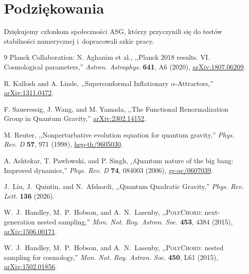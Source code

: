\documentclass[11pt,a4paper]{article}
\begin{document}
\section*{Podziękowania}
Dziękujemy członkom społeczności ASG, którzy przyczynili się do testów stabilności numerycznej i~dopracowali szkic pracy.

\begin{thebibliography}{9}
Planck Collaboration: N. Aghanim et al., ,,Planck 2018 results. VI. Cosmological parameters,'' \textit{Astron. Astrophys.} \textbf{641}, A6 (2020), \href{https://arxiv.org/abs/1807.06209}{arXiv:1807.06209}.

R. Kallosh and A. Linde, ,,Superconformal Inflationary $\alpha$-Attractors,'' \href{https://arxiv.org/abs/1311.0472}{arXiv:1311.0472}.

F. Saueressig, J. Wang, and M. Yamada, ,,The Functional Renormalization Group in Quantum Gravity,'' \href{https://arxiv.org/abs/2302.14152}{arXiv:2302.14152}.

M. Reuter, ,,Nonperturbative evolution equation for quantum gravity,'' \textit{Phys. Rev. D} \textbf{57}, 971 (1998), \href{https://arxiv.org/abs/hep-th/9605030}{hep-th/9605030}.

A. Ashtekar, T. Pawlowski, and P. Singh, ,,Quantum nature of the big bang: Improved dynamics,'' \textit{Phys. Rev. D} \textbf{74}, 084003 (2006), \href{https://arxiv.org/abs/gr-qc/0607039}{gr-qc/0607039}.

J.~Liu, J.~Quintin, and N.~Afshordi, ,,Quantum Quadratic Gravity,'' \textit{Phys. Rev. Lett.} \textbf{136} (2026).

W.~J.~Handley, M.~P.~Hobson, and A.~N.~Lasenby, ,,\textsc{PolyChord}: next-generation nested sampling,'' \textit{Mon. Not. Roy. Astron. Soc.} \textbf{453}, 4384 (2015), \href{https://arxiv.org/abs/1506.00171}{arXiv:1506.00171}.

W.~J.~Handley, M.~P.~Hobson, and A.~N.~Lasenby, ,,\textsc{PolyChord}: nested sampling for cosmology,'' \textit{Mon. Not. Roy. Astron. Soc.} \textbf{450}, L61 (2015), \href{https://arxiv.org/abs/1502.01856}{arXiv:1502.01856}.
\end{thebibliography}
\end{document}
